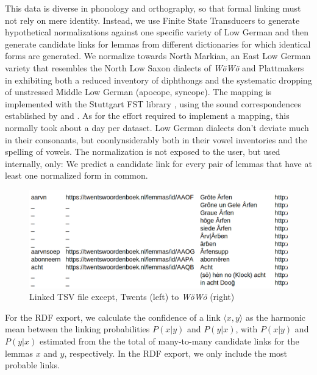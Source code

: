 This data is diverse in phonology and orthography, so that formal linking must not rely on mere identity. Instead, we use Finite State Transducers to generate hypothetical normalizations against one specific variety of Low German and then generate candidate links for lemmas from different dictionaries for which identical forms are generated. We normalize towards North Markian, an East Low German variety that resembles the North Low Saxon dialects of \emph{WöWö} and Plattmakers in exhibiting both a reduced inventory of diphthongs and the systematic dropping of unstressed Middle Low German  (apocope, syncope). The mapping is implemented with the Stuttgart FST library \cite{schmid2006programming}, using the sound correspondences established by \cite{pfaff1898vocale,teuchert1907mundart} and \cite{mackel1905mundart}. As for the effort required to implement a mapping, this normally took about a day per dataset. Low German dialects don't deviate much in their consonants, but coonlynsiderably both in their vowel inventories and the spelling of vowels. The normalization is not exposed to the user, but used internally, only: We predict a candidate link for every pair of lemmas that have at least one normalized form in common.

\begin{figure}
    \flushleft
    \includegraphics[width=1\linewidth]{img/tsv-linked.png}
    \caption{Linked TSV file except, Twents (left) to \emph{WöWö} (right)}
    \label{fig-twents-woewoe}
\end{figure}

For the RDF export, we calculate the confidence of a link $\langle x,y\rangle$ as the harmonic mean between the linking probabilities $P(x|y)$ and $P(y|x)$, with $P(x|y)$ and $P(y|x)$  estimated from the the total of many-to-many candidate links for the lemmas $x$ and $y$, respectively. In the RDF export, we only include the most probable links. 


